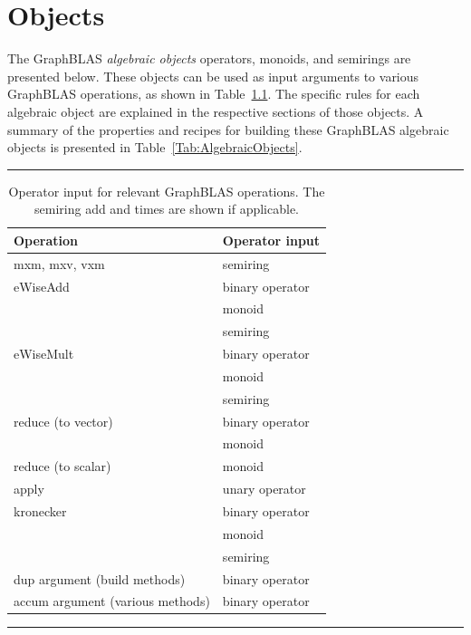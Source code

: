 \chapter{Objects}
\label{Chp:Objects}

The GraphBLAS \emph{algebraic objects} operators, monoids, and semirings
are presented below.
These objects can be used as input arguments to various GraphBLAS
operations, as shown in Table~\ref{Tab:OperatorInputType}.
The specific rules for each algebraic object
are explained in the respective sections of those objects.  A summary
of the properties and recipes for building these GraphBLAS algebraic
objects is presented in Table~\ref{Tab:AlgebraicObjects}.

\begin{table}
    \hrule
    \begin{center}
        \caption{Operator input for relevant GraphBLAS operations. 
        The semiring add and times are shown if applicable.}
        \label{Tab:OperatorInputType}
        \begin{tabular}{l|l}
        Operation           			& Operator input  	\\ \hline
        {\sf mxm, mxv, vxm} 			& semiring 		\\ \hline
        {\sf eWiseAdd}      			& binary operator   	\\
                            			& monoid           	\\
                            			& semiring          	\\ \hline
        {\sf eWiseMult}     			& binary operator   	\\
                            			& monoid          	\\
                            			& semiring         	\\ \hline
       {\sf reduce} (to vector)  		& binary operator	\\ 
                            			& monoid           	\\ \hline
       {\sf reduce} (to scalar)  		& monoid           	\\ \hline
       {\sf apply}         			    & unary operator   	\\ \hline
       {\sf kronecker}                  & binary operator   	\\
                            			& monoid           	\\
                            			& semiring          	\\ \hline
       {\sf dup} argument (build methods)  	& binary operator   	\\ \hline
       {\sf accum} argument (various methods) 	& binary operator  	\\
       \end{tabular}
    \end{center}
    \hrule
\end{table}

